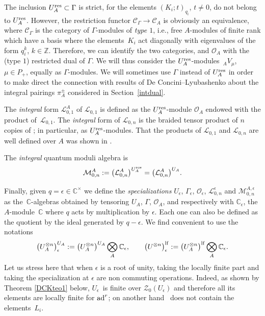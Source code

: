 \documentclass[10pt,a4paper]{amsart}
\numberwithin{equation}{section}
\theoremstyle{definition}
\newcommand{\e}{\epsilon}
\newcommand{\mc}{\mathbb{C}}
\newcommand{\mz}{\mathbb{Z}}
\newcommand{\Ll}{{\mathcal L}}
\newcommand{\Mm}{{\mathcal M}}
\newcommand{\Oo}{{\mathcal O}}
\newcommand{\ra}{\rightarrow}
\begin{document}
The inclusion $U_A^{\rm res}\subset \Gamma$ is strict, for the elements $(K_i; t)_{q_i}$, $t\ne 0$, do not belong to $U_A^{\rm res}$. However, the restriction functor $\mathcal{C}_\Gamma \ra\mathcal{C}_A$ is obviously an equivalence, where $\mathcal{C}_\Gamma$ is the category of $\Gamma$-modules of {\it type $1$}, i.e., free $A$-modules of finite rank which have a basis where the elements~$K_i$ act diagonally with eigenvalues of the form $q_i^k$, $k\in \mz$. Therefore, we can identify the two categories, and $\Oo_A$ with the (type $1$) restricted dual of $\Gamma$. We will thus consider the $U_A^{\rm res}$-modules~${}_AV_\mu$, $\mu\in P_+$, equally as $\Gamma$-modules. We will sometimes use $\Gamma$ instead of $U_A^{\rm res}$ in order to make direct the connection with results of De Concini--Lyubashenko about the integral pairings $\pi_A^\pm$ considered in Section~\ref{intdual}.

The {\it integral} form $\Ll_{0,1}^A$ of $\Ll_{0,1}$ is defined as the $U_A^{\rm res}$-module $\Oo_A$ endowed with the product of~$\Ll_{0,1}$. The {\it integral} form \smash{$\Ll_{0,n}^A$} of $\Ll_{0,n}$ is the braided tensor product of $n$ copies of \smash{$\Ll_{0,1}^A$}; in particular, \smash{$\Ll_{0,n}^A = \Oo_A^{\otimes n}$} as $U_A^{\rm res}$-modules. That the products of $\Ll_{0,1}$ and $\Ll_{0,n}$ are well defined over $A$ was shown in \cite[Proposition~6.9]{BR}.

The {\it integral} quantum moduli algebra is
\[\Mm_{0,n}^A := \big(\Ll_{0,n}^A\big)^{U_A^{\rm res}} = \big(\Ll_{0,n}^A\big)^{U_A}.\]

Finally, given $q=\e\in \mc^{\times}$ we define the {\it specializations} $U_\e$, $\Gamma_\e$, $\Oo_\e$, $\Ll_{0,n}^{\e}$ and $\Mm_{0,n}^{A,\e}$ as the~$\mc$-algebras obtained by tensoring $U_A$, $\Gamma$, $\Oo_A$, \smash{$\Ll_{0,n}^A$} and \smash{$\Mm_{0,n}^A$} respectively with $\mc_\e$, the $A$-module~$\mc$ where $q$ acts by multiplication by $\e$. Each one can also be defined as the quotient by the ideal generated by $q-\e$. We find convenient to use the notations
\begin{equation}\label{notambig0}
\big(U_A^{\otimes n}\big)^{U_A}_\e:= \big(U_A^{\otimes n}\big)^{U_A}\bigotimes_A \mc_\e,\qquad \big(U^{\otimes n}\big)^{\rm lf}_\e:= \big(U_A^{\otimes n}\big)^{\rm lf}\bigotimes_A \mc_\e .
\end{equation}
Let us stress here that when $\e$ is a root of unity, taking the locally finite part and taking the specialization at $\e$ are non commuting operations. Indeed, as shown by Theorem \ref{DCKteo1} below, $U_\e$~is finite over $\mathcal{Z}_0(U_\e)$ and therefore all its elements are locally finite for ${\rm ad}^r$; on another hand~\smash{${U_\e^{\rm lf} = U_A^{\rm lf}\bigotimes_A \mc_\e}$} does not contain the elements~$L_i$.
\end{document}
